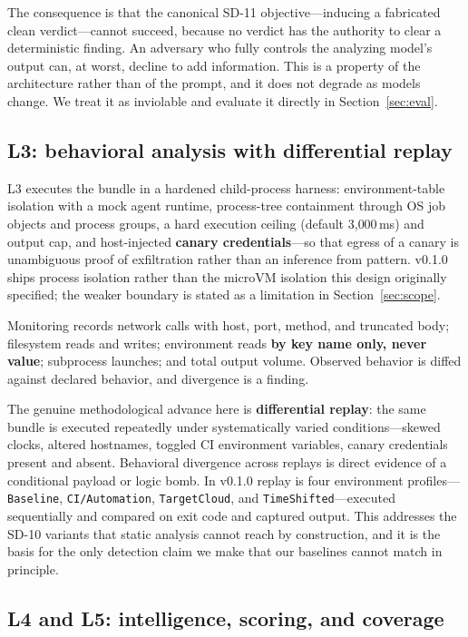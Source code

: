 \documentclass[11pt]{article}
\begin{document}
The consequence is that the canonical SD-11 objective---inducing a fabricated
clean verdict---cannot succeed, because no verdict has the authority to clear a
deterministic finding. An adversary who fully controls the analyzing model's
output can, at worst, decline to add information. This is a property of the
architecture rather than of the prompt, and it does not degrade as models
change. We treat it as inviolable and evaluate it directly in
Section~\ref{sec:eval}.

\subsection{L3: behavioral analysis with differential replay}
\label{sec:l3}

L3 executes the bundle in a hardened child-process harness: environment-table
isolation with a mock agent runtime, process-tree containment through OS job
objects and process groups, a hard execution ceiling (default 3{,}000\,ms) and
output cap, and host-injected \textbf{canary credentials}---so that egress of a
canary is unambiguous proof of exfiltration rather than an inference from
pattern. v0.1.0 ships process isolation rather than the microVM isolation this
design originally specified; the weaker boundary is stated as a limitation in
Section~\ref{sec:scope}.

Monitoring records network calls with host, port, method, and truncated body;
filesystem reads and writes; environment reads \textbf{by key name only, never
value}; subprocess launches; and total output volume. Observed behavior is
diffed against declared behavior, and divergence is a finding.

The genuine methodological advance here is \textbf{differential replay}: the
same bundle is executed repeatedly under systematically varied
conditions---skewed clocks, altered hostnames, toggled CI environment
variables, canary credentials present and absent. Behavioral divergence across
replays is direct evidence of a conditional payload or logic bomb. In v0.1.0
replay is four environment profiles---\texttt{Baseline},
\texttt{CI/Automation}, \texttt{TargetCloud}, and
\texttt{TimeShifted}---executed sequentially and compared on exit code and
captured output. This addresses the SD-10 variants that static analysis cannot
reach by construction, and it is the basis for the only detection claim we make
that our baselines cannot match in principle.

\subsection{L4 and L5: intelligence, scoring, and coverage}
\label{sec:l45}
\end{document}
